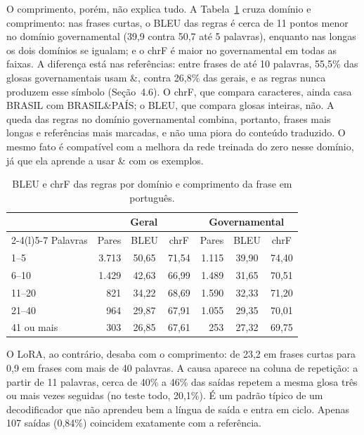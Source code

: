 \documentclass[12pt]{article}
\newcommand{\gl}[1]{\textsf{\small #1}}
\begin{document}
O comprimento, porém, não explica tudo. A Tabela~\ref{tab:domcomp} cruza domínio e comprimento: nas frases curtas, o BLEU das regras é cerca de 11 pontos menor no domínio governamental (39,9 contra 50,7 até 5 palavras), enquanto nas longas os dois domínios se igualam; e o chrF é maior no governamental em todas as faixas. A diferença está nas referências: entre frases de até 10 palavras, 55,5\% das glosas governamentais usam \gl{\&}, contra 26,8\% das gerais, e as regras nunca produzem esse símbolo (Seção~4.6). O chrF, que compara caracteres, ainda casa \gl{BRASIL} com \gl{BRASIL\&PAÍS}; o BLEU, que compara glosas inteiras, não. A queda das regras no domínio governamental combina, portanto, frases mais longas e referências mais marcadas, e não uma piora do conteúdo traduzido. O mesmo fato é compatível com a melhora da rede treinada do zero nesse domínio, já que ela aprende a usar \gl{\&} com os exemplos.

\begin{table}[!htbp]\centering\footnotesize
\caption{BLEU e chrF das regras por domínio e comprimento da frase em português.}\label{tab:domcomp}
\begin{tabular}{@{}lrccrcc@{}}\toprule
 & \multicolumn{3}{c}{Geral} & \multicolumn{3}{c}{Governamental}\\
\cmidrule(lr){2-4}\cmidrule(l){5-7}
Palavras & Pares & BLEU & chrF & Pares & BLEU & chrF\\\midrule
1--5 & 3.713 & 50,65 & 71,54 & 1.115 & 39,90 & 74,40\\
6--10 & 1.429 & 42,63 & 66,99 & 1.489 & 31,65 & 70,51\\
11--20 & 821 & 34,22 & 68,69 & 1.590 & 32,33 & 71,20\\
21--40 & 964 & 29,87 & 67,91 & 1.055 & 29,35 & 70,01\\
41 ou mais & 303 & 26,85 & 67,61 & 253 & 27,32 & 69,75\\\bottomrule
\end{tabular}
\end{table}

O LoRA, ao contrário, desaba com o comprimento: de 23,2 em frases curtas para 0,9 em frases com mais de 40 palavras. A causa aparece na coluna de repetição: a partir de 11 palavras, cerca de 40\% a 46\% das saídas repetem a mesma glosa três ou mais vezes seguidas (no teste todo, 20,1\%). É um padrão típico de um decodificador que não aprendeu bem a língua de saída e entra em ciclo. Apenas 107 saídas (0,84\%) coincidem exatamente com a referência.
\end{document}
